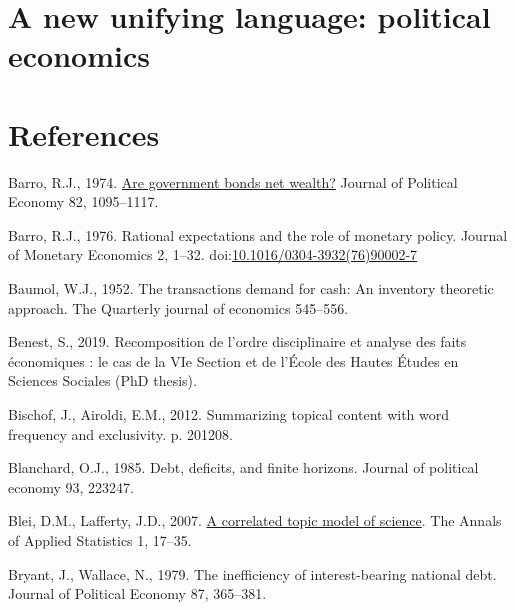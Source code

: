 \documentclass[]{elsarticle} %
\newlength{\cslhangindent}
\newlength{\cslentryspacingunit} %
\newenvironment{CSLReferences}[2] %
 {%
  \setlength{\parindent}{0pt}
  \ifodd #1
  \let\oldpar\par
  \def\par{\hangindent=\cslhangindent\oldpar}
  \fi
  \setlength{\parskip}{#2\cslentryspacingunit}
 }%
 {}
\begin{document}
\hypertarget{a-new-unifying-language-political-economics}{%
\section{A new unifying language: political
economics}\label{a-new-unifying-language-political-economics}}

\newpage

\hypertarget{references}{%
\section*{References}\label{references}}

\hypertarget{refs}{}
\begin{CSLReferences}{1}{0}
\leavevmode{}%
Barro, R.J., 1974. \href{http://www.jstor.org/stable/1830663}{Are
government bonds net wealth?} Journal of Political Economy 82,
1095--1117.

\leavevmode{}%
Barro, R.J., 1976. Rational expectations and the role of monetary
policy. Journal of Monetary Economics 2, 1--32.
doi:\href{https://doi.org/10.1016/0304-3932(76)90002-7}{10.1016/0304-3932(76)90002-7}

\leavevmode{}%
Baumol, W.J., 1952. The transactions demand for cash: {An} inventory
theoretic approach. The Quarterly journal of economics 545--556.

\leavevmode{}%
Benest, S., 2019. Recomposition de l'ordre disciplinaire et analyse des
faits économiques : le cas de la VIe Section et de l'École des Hautes
Études en Sciences Sociales (PhD thesis).

\leavevmode{}%
Bischof, J., Airoldi, E.M., 2012. Summarizing topical content with word
frequency and exclusivity. p. 201208.

\leavevmode{}%
Blanchard, O.J., 1985. Debt, deficits, and finite horizons. Journal of
political economy 93, 223247.

\leavevmode{}%
Blei, D.M., Lafferty, J.D., 2007.
\href{https://www.jstor.org/stable/4537420}{A correlated topic model of
science}. The Annals of Applied Statistics 1, 17--35.

\leavevmode{}%
Bryant, J., Wallace, N., 1979. The inefficiency of interest-bearing
national debt. Journal of Political Economy 87, 365--381.


\end{CSLReferences}
\end{document}

